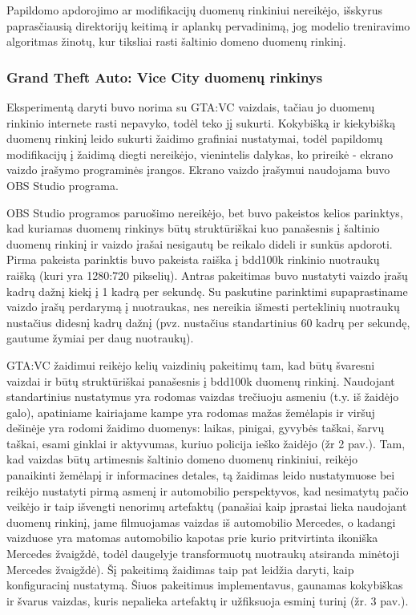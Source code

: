 \documentclass{VUMIFPSkursinis}
\begin{document}
            Papildomo apdorojimo ar modifikacijų duomenų rinkiniui nereikėjo, išskyrus paprasčiausią direktorijų keitimą ir aplankų pervadinimą, jog modelio treniravimo algoritmas žinotų, kur tiksliai rasti šaltinio domeno duomenų rinkinį.
        \subsubsection{Grand Theft Auto: Vice City duomenų rinkinys}
            Eksperimentą daryti buvo norima su GTA:VC vaizdais, tačiau jo duomenų rinkinio internete rasti nepavyko, todėl teko jį sukurti. Kokybišką ir kiekybišką duomenų rinkinį leido sukurti žaidimo grafiniai nustatymai, todėl papildomų modifikacijų į žaidimą diegti nereikėjo, vienintelis dalykas, ko prireikė - ekrano vaizdo įrašymo programinės įrangos. Ekrano vaizdo įrašymui naudojama buvo OBS Studio programa.
            
            OBS Studio programos paruošimo nereikėjo, bet buvo pakeistos kelios parinktys, kad kuriamas duomenų rinkinys būtų struktūriškai kuo panašesnis į šaltinio duomenų rinkinį ir vaizdo įrašai nesigautų be reikalo dideli ir sunkūs apdoroti. Pirma pakeista parinktis buvo pakeista raiška į bdd100k rinkinio nuotraukų raišką (kuri yra 1280:720 pikselių). Antras pakeitimas buvo nustatyti vaizdo įrašų kadrų dažnį kiekį į 1 kadrą per sekundę. Su paskutine parinktimi supaprastiname vaizdo įrašų perdarymą į nuotraukas, nes nereikia išmesti perteklinių nuotraukų nustačius didesnį kadrų dažnį (pvz. nustačius standartinius 60 kadrų per sekundę, gautume žymiai per daug nuotraukų).
            
            GTA:VC žaidimui reikėjo kelių vaizdinių pakeitimų tam, kad būtų švaresni vaizdai ir būtų struktūriškai panašesnis į bdd100k duomenų rinkinį. Naudojant standartinius nustatymus yra rodomas vaizdas trečiuoju asmeniu (t.y. iš žaidėjo galo), apatiniame kairiajame kampe yra rodomas mažas žemėlapis ir viršuj dešinėje yra rodomi žaidimo duomenys: laikas, pinigai, gyvybės taškai, šarvų taškai, esami ginklai ir aktyvumas, kuriuo policija ieško žaidėjo (žr 2 pav.). Tam, kad vaizdas būtų artimesnis šaltinio domeno duomenų rinkiniui, reikėjo panaikinti žemėlapį ir informacines detales, tą žaidimas leido nustatymuose bei reikėjo nustatyti pirmą asmenį ir automobilio perspektyvos, kad nesimatytų pačio veikėjo ir taip išvengti nenorimų artefaktų (panašiai kaip įprastai lieka naudojant \cite{DaimCityDaSe} duomenų rinkinį, jame filmuojamas vaizdas iš automobilio Mercedes, o kadangi vaizduose yra matomas automobilio kapotas prie kurio pritvirtinta ikoniška Mercedes žvaigždė, todėl daugelyje transformuotų nuotraukų atsiranda minėtoji Mercedes žvaigždė). Šį pakeitimą žaidimas taip pat leidžia daryti, kaip konfiguracinį nustatymą. Šiuos pakeitimus implementavus, gaunamas kokybiškas ir švarus vaizdas, kuris nepalieka artefaktų ir užfiksuoja esminį turinį (žr. 3 pav.).
            
\end{document}
